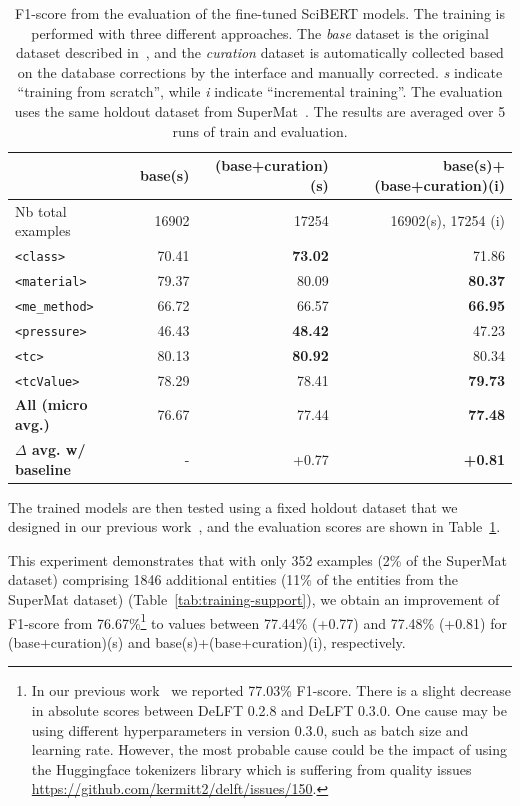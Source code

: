 \begin{table}[htbp]
\centering\small
\caption{F1-score from the evaluation of the fine-tuned SciBERT models. The training is performed with three different approaches. 
The \emph{base} dataset is the original dataset described in~\cite{foppiano2021supermat}, and the \emph{curation} dataset is automatically collected based on the database corrections by the interface and manually corrected. \textit{s} indicate ``training from scratch'', while \textit{i} indicate ``incremental training''. 
The evaluation uses the same holdout dataset from SuperMat~\cite{foppiano2021supermat}. 
The results are averaged over 5 runs of train and evaluation. }
\begin{tabular}{lrrr}
\toprule
& \textbf{base(s)} & \textbf{(base+curation)(s)} & \textbf{base(s)+(base+curation)(i)} \\ 
\midrule
Nb total examples & 16902 & 17254 & 16902(s), 17254 (i)\\ 
\midrule
\texttt{<class>}        & 70.41         & \textbf{73.02}         & 71.86 \\ 
\texttt{<material>}     & 79.37         & 80.09         & \textbf{80.37} \\ 
\texttt{<me\_method>}   & 66.72         & 66.57         & \textbf{66.95} \\ 
\texttt{<pressure>}     & 46.43         & \textbf{48.42}         & 47.23 \\ 
\texttt{<tc>}           & 80.13         & \textbf{80.92}         & 80.34 \\ 
\texttt{<tcValue>}      & 78.29         & 78.41         & \textbf{79.73} \\ 
\midrule
\textbf{All (micro avg.)} & 76.67       & 77.44         & \textbf{77.48} \\ 
\midrule
\textbf{$\Delta$ avg. w/ baseline}& -   & +0.77     & \textbf{+0.81} \\ 
\bottomrule
\end{tabular}
\label{tab:evaluation-curation-training2}
\end{table}


The trained models are then tested using a fixed holdout dataset that we designed in our previous work~\cite{foppiano2023automatic}, and the evaluation scores are shown in Table~\ref{tab:evaluation-curation-training2}.

This experiment demonstrates that with only 352 examples (2\% of the SuperMat dataset) comprising 1846 additional entities (11\% of the entities from the SuperMat dataset) (Table~\ref{tab:training-support}), we obtain an improvement of F1-score from 76.67\%\footnote{In our previous work~\cite{foppiano2023automatic} we reported 77.03\% F1-score. 
There is a slight decrease in absolute scores between DeLFT 0.2.8 and DeLFT 0.3.0. 
One cause may be using different hyperparameters in version 0.3.0, such as batch size and learning rate.
However, the most probable cause could be the impact of using the Huggingface tokenizers library which is suffering from quality issues \url{https://github.com/kermitt2/delft/issues/150}.} to values between 77.44\% (+0.77) and 77.48\% (+0.81) for (base+curation)(s) and base(s)+(base+curation)(i), respectively. 


